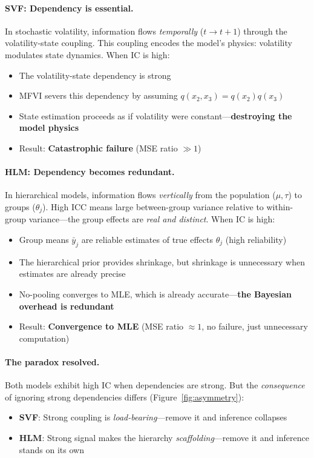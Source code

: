 \documentclass[10pt]{article} %
\theoremstyle{plain}
\theoremstyle{definition}
\begin{document}
\paragraph{SVF: Dependency is essential.} In stochastic volatility, information flows \emph{temporally} ($t \to t+1$) through the volatility-state coupling. This coupling encodes the model's physics: volatility modulates state dynamics. When IC is high:
\begin{itemize}
    \item The volatility-state dependency is strong
    \item MFVI severs this dependency by assuming $q(x_2, x_3) = q(x_2)q(x_3)$
    \item State estimation proceeds as if volatility were constant---\textbf{destroying the model physics}
    \item Result: \textbf{Catastrophic failure} (MSE ratio $\gg 1$)
\end{itemize}

\paragraph{HLM: Dependency becomes redundant.} In hierarchical models, information flows \emph{vertically} from the population ($\mu, \tau$) to groups ($\theta_j$). High ICC means large between-group variance relative to within-group variance---the group effects are \emph{real and distinct}. When IC is high:
\begin{itemize}
    \item Group means $\bar{y}_j$ are reliable estimates of true effects $\theta_j$ (high reliability)
    \item The hierarchical prior provides shrinkage, but shrinkage is unnecessary when estimates are already precise
    \item No-pooling converges to MLE, which is already accurate---\textbf{the Bayesian overhead is redundant}
    \item Result: \textbf{Convergence to MLE} (MSE ratio $\approx 1$, no failure, just unnecessary computation)
\end{itemize}

\paragraph{The paradox resolved.} Both models exhibit high IC when dependencies are strong. But the \emph{consequence} of ignoring strong dependencies differs (Figure~\ref{fig:asymmetry}):
\begin{itemize}
    \item \textbf{SVF}: Strong coupling is \emph{load-bearing}---remove it and inference collapses
    \item \textbf{HLM}: Strong signal makes the hierarchy \emph{scaffolding}---remove it and inference stands on its own
\end{itemize}
\end{document}
